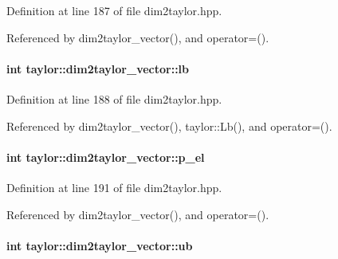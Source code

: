\-Definition at line 187 of file dim2taylor.\-hpp.



\-Referenced by dim2taylor\-\_\-vector(), and operator=().

\hypertarget{classtaylor_1_1dim2taylor__vector_a2ba35c1941839c74ae6e29477df56163}{
\paragraph[{lb}]{\setlength{\rightskip}{0pt plus 5cm}int {\bf taylor\-::dim2taylor\-\_\-vector\-::lb}}}\label{classtaylor_1_1dim2taylor__vector_a2ba35c1941839c74ae6e29477df56163}


\-Definition at line 188 of file dim2taylor.\-hpp.



\-Referenced by dim2taylor\-\_\-vector(), taylor\-::\-Lb(), and operator=().

\hypertarget{classtaylor_1_1dim2taylor__vector_abf767a36fd0b0fc7658b018cb1a29e55}{
\paragraph[{p\-\_\-el}]{\setlength{\rightskip}{0pt plus 5cm}int {\bf taylor\-::dim2taylor\-\_\-vector\-::p\-\_\-el}}}\label{classtaylor_1_1dim2taylor__vector_abf767a36fd0b0fc7658b018cb1a29e55}


\-Definition at line 191 of file dim2taylor.\-hpp.



\-Referenced by dim2taylor\-\_\-vector(), and operator=().

\hypertarget{classtaylor_1_1dim2taylor__vector_a5a1d2347123e0bbc823b57a8d6f4d74c}{
\paragraph[{ub}]{\setlength{\rightskip}{0pt plus 5cm}int {\bf taylor\-::dim2taylor\-\_\-vector\-::ub}}}\label{classtaylor_1_1dim2taylor__vector_a5a1d2347123e0bbc823b57a8d6f4d74c}



